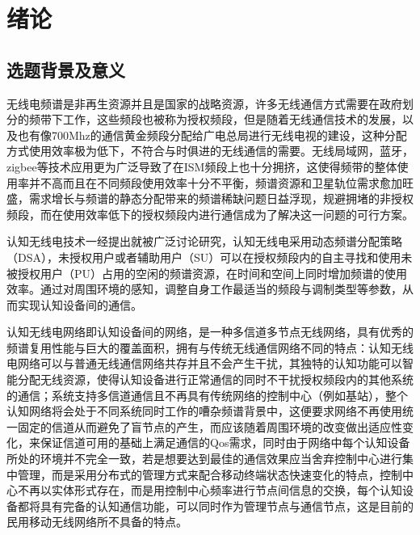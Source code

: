 \documentclass[a4paper,AutoFakeBold,oneside,12pt]{book}
\begin{document}
  
\newpage

  
\newpage

  
\newpage

 
\newpage

\frontmatter\tableofcontents %

\newpage\mainmatter
{} %
\pagestyle{fancy} %


\chapter{绪论}
\section{选题背景及意义}
  无线电频谱是非再生资源并且是国家的战略资源，许多无线通信方式需要在政府划分的频带下工作，这些频段也被称为授权频段，但是随着无线通信技术的发展，以及也有像700Mhz的通信黄金频段分配给广电总局进行无线电视的建设，这种分配方式使用效率极为低下，不符合与时俱进的无线通信的需要。无线局域网，蓝牙，zigbee等技术应用更为广泛导致了在ISM频段上也十分拥挤，这使得频带的整体使用率并不高而且在不同频段使用效率十分不平衡，频谱资源和卫星轨位需求愈加旺盛，需求增长与频谱的静态分配带来的频谱稀缺问题日益浮现，规避拥堵的非授权频段，而在使用效率低下的授权频段内进行通信成为了解决这一问题的可行方案。

  认知无线电技术一经提出就被广泛讨论研究，认知无线电采用动态频谱分配策略（DSA），未授权用户或者辅助用户（SU）可以在授权频段内的自主寻找和使用未被授权用户（PU）占用的空闲的频谱资源，在时间和空间上同时增加频谱的使用效率。通过对周围环境的感知，调整自身工作最适当的频段与调制类型等参数，从而实现认知设备间的通信。

  认知无线电网络即认知设备间的网络，是一种多信道多节点无线网络，具有优秀的频谱复用性能与巨大的覆盖面积，拥有与传统无线通信网络不同的特点：认知无线电网络可以与普通无线通信网络共存并且不会产生干扰，其独特的认知功能可以智能分配无线资源，使得认知设备进行正常通信的同时不干扰授权频段内的其他系统的通信；系统支持多信道通信且不再具有传统网络的控制中心（例如基站），整个认知网络将会处于不同系统同时工作的嘈杂频谱背景中，这便要求网络不再使用统一固定的信道从而避免了盲节点的产生，而应该随着周围环境的改变做出适应性变化，来保证信道可用的基础上满足通信的Qos需求，同时由于网络中每个认知设备所处的环境并不完全一致，若是想要达到最佳的通信效果应当舍弃控制中心进行集中管理，而是采用分布式的管理方式来配合移动终端状态快速变化的特点，控制中心不再以实体形式存在，而是用控制中心频率进行节点间信息的交换，每个认知设备都将具有完备的认知通信功能，可以同时作为管理节点与通信节点，这是目前的民用移动无线网络所不具备的特点。
  
\end{document}
